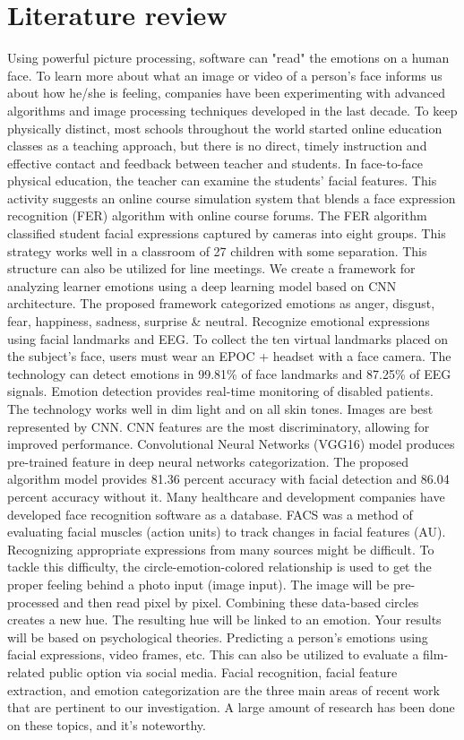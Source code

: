 \documentclass{ieeeaccess}
\begin{document}
\section{Literature review}
Using powerful picture processing, software can "read" the emotions on a human face. To learn more about what an image or video of a person's face informs us about how he/she is feeling, companies have been experimenting with advanced algorithms and image processing techniques developed in the last decade.
To keep physically distinct, most schools throughout the world started online education classes as a teaching approach, but there is no direct, timely instruction and effective contact and feedback between teacher and students. In face-to-face physical education, the teacher can examine the students' facial features. This activity suggests an online course simulation system that blends a face expression recognition (FER) algorithm with online course forums. The FER algorithm classified student facial expressions captured by cameras into eight groups. This strategy works well in a classroom of 27 children with some separation. This structure can also be utilized for line meetings. We create a framework for analyzing learner emotions using a deep learning model based on CNN architecture. The proposed framework categorized emotions as anger, disgust, fear, happiness, sadness, surprise & neutral. Recognize emotional expressions using facial landmarks and EEG. To collect the ten virtual landmarks placed on the subject's face, users must wear an EPOC + headset with a face camera. The technology can detect emotions in 99.81\% of face landmarks and 87.25\% of EEG signals. Emotion detection provides real-time monitoring of disabled patients. The technology works well in dim light and on all skin tones. Images are best represented by CNN. CNN features are the most discriminatory, allowing for improved performance. Convolutional Neural Networks (VGG16) model produces pre-trained feature in deep neural networks categorization. The proposed algorithm model provides 81.36 percent accuracy with facial detection and 86.04 percent accuracy without it. Many healthcare and development companies have developed face recognition software as a database. FACS was a method of evaluating facial muscles (action units) to track changes in facial features (AU). Recognizing appropriate expressions from many sources might be difficult. To tackle this difficulty, the circle-emotion-colored relationship is used to get the proper feeling behind a photo input (image input). The image will be pre-processed and then read pixel by pixel. Combining these data-based circles creates a new hue. The resulting hue will be linked to an emotion. Your results will be based on psychological theories. Predicting a person's emotions using facial expressions, video frames, etc. This can also be utilized to evaluate a film-related public option via social media. Facial recognition, facial feature extraction, and emotion categorization are the three main areas of recent work that are pertinent to our investigation. A large amount of research has been done on these topics, and it's noteworthy.
\end{document}
